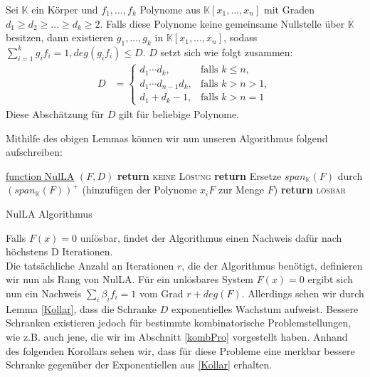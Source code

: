 \begin{lemma} \label{Kollar}
Sei $\mathbb{K}$ ein Körper und $f_1,\ldots,f_k$ Polynome aus $\mathbb{K}[x_1,\ldots,x_n]$ mit Graden $d_1\ge d_2 \ge \ldots \ge d_k \ge 2$. Falls diese Polynome keine gemeinsame Nullstelle über $\overline{\mathbb{K}}$ besitzen, dann existieren $g_1,\ldots,g_k$ in $\mathbb{K}[x_1,\ldots,x_n]$, sodass $\sum_{i=1}^k g_if_i=1, deg(g_if_i) \le D$. $D$ setzt sich wie folgt zusammen:
\begin{align}
D &= \begin{cases} d_1\cdots d_k, & \text{falls $k \le n$}, \\ d_1\cdots d_{n-1}d_k, &
  \text{falls $k > n > 1$}, \\ d_1+d_k-1, & \text{falls $k > n = 1$} \end{cases}
\end{align} 
Diese Abschätzung für $D$ gilt für beliebige Polynome.
\end{lemma}

\noindent Mithilfe des obigen Lemmas können wir nun unseren Algorithmus folgend aufschreiben:\\
\begin{algorithm} [H]

    \underline{function NulLA} $(F,D)$\;
		 {
      {
        \textbf{return} \textsc{keine Lösung}\;
      }
      {
        \textbf{return} Ersetze $span_\mathbb{K}(F)$ durch $(span_\mathbb{K}(F))^+$ (hinzufügen der Polynome $x_iF$ zur Menge $F$)\;
      }
		}
		\textbf{return} \textsc{lösbar}
    \caption{NulLA Algorithmus}
\end{algorithm}

\noindent Falls $F(x)=0$ unlösbar, findet der Algorithmus einen Nachweis dafür nach höchstens D Iterationen. \\
Die tatsächliche Anzahl an Iterationen $r$, die der Algorithmus benötigt, definieren wir nun als Rang von NulLA. Für ein unlösbares System $F(x)=0$ ergibt sich nun ein Nachweis $\sum_{i} \beta_if_i=1$ vom Grad $r + deg(F)$. Allerdings sehen wir durch Lemma \ref{Kollar}, dass die Schranke $D$ exponentielles Wachstum aufweist. Bessere Schranken existieren jedoch für bestimmte kombinatorische Problemstellungen, wie z.B. auch jene, die wir im Abschnitt \ref{kombPro} vorgestellt haben. Anhand des folgenden Korollars sehen wir, dass für diese Probleme eine merkbar bessere Schranke gegenüber der Exponentiellen aus \ref{Kollar} erhalten. 

